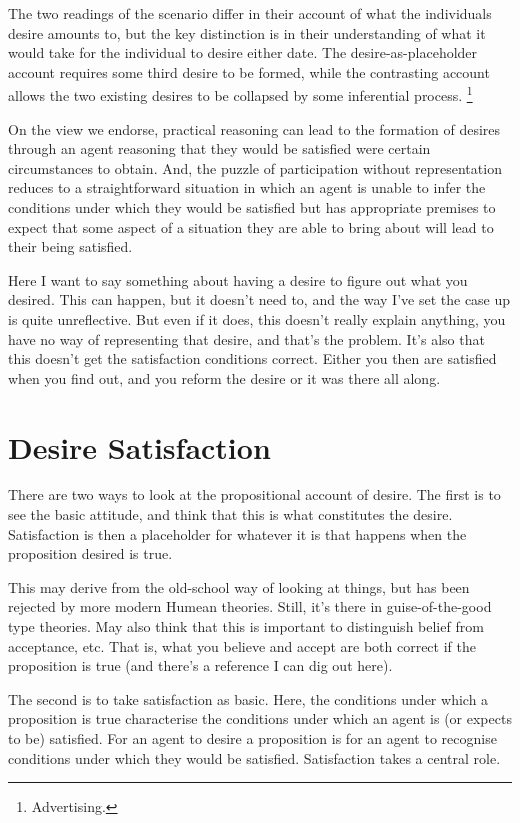 \documentclass[10pt]{article}
\begin{document}
The two readings of the scenario differ in their account of what the individuals desire amounts to, but the key distinction is in their understanding of what it would take for the individual to desire either date.
The desire-as-placeholder account requires some third desire to be formed, while the contrasting account allows the two existing desires to be collapsed by some inferential process.\nolinebreak
\footnote{\color{red} Advertising.}


On the view we endorse, practical reasoning can lead to the formation of desires through an agent reasoning that they would be satisfied were certain circumstances to obtain.
And, the puzzle of participation without representation reduces to a straightforward situation in which an agent is unable to infer the conditions under which they would be satisfied but has appropriate premises to expect that some aspect of a situation they are able to bring about will lead to their being satisfied.



{\color{red}
  Here I want to say something about having a desire to figure out what you desired.
  This can happen, but it doesn't need to, and the way I've set the case up is quite unreflective.
  But even if it does, this doesn't really explain anything, you have no way of representing that desire, and that's the problem.
  It's also that this doesn't get the satisfaction conditions correct.
  Either you then are satisfied when you find out, and you reform the desire or it was there all along.
}

\section{Desire Satisfaction}
\label{sec:desire-satisfaction}

There are two ways to look at the propositional account of desire.
The first is to see the basic attitude, and think that this is what constitutes the desire.
Satisfaction is then a placeholder for whatever it is that happens when the proposition desired is true.

This may derive from the old-school way of looking at things, but has been rejected by more modern Humean theories.
Still, it's there in guise-of-the-good type theories.
May also think that this is important to distinguish belief from acceptance, etc.
That is, what you believe and accept are both correct if the proposition is true (and there's a reference I can dig out here).

The second is to take satisfaction as basic.
Here, the conditions under which a proposition is true characterise the conditions under which an agent is (or expects to be) satisfied.
For an agent to desire a proposition is for an agent to recognise conditions under which they would be satisfied.
Satisfaction takes a central role.
\end{document}
